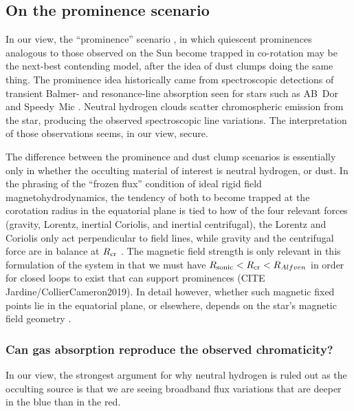 \documentclass[11pt,twocolumn,tighten]{aastex63}
\begin{document}
\subsection{On the prominence scenario}

In our view, the ``prominence'' scenario
\citep{2017AJ....153..152S,2022MNRAS.514.5465W}, in which quiescent
prominences analogous to those observed on the Sun become trapped in
co-rotation may be the next-best contending model, after the idea of
dust clumps doing the same thing.  The prominence idea historically
came from spectroscopic detections of transient Balmer- and
resonance-line absorption seen for stars such as AB~Dor and
Speedy~Mic \citep[see
e.g.][]{1989MNRAS.238..657C,1993MNRAS.262..369J,2019MNRAS.482.2853J}.
Neutral hydrogen clouds scatter chromospheric emission from the star,
producing the observed spectroscopic line variations.  The
interpretation of those observations seems, in our view, secure.

The difference between the prominence and dust clump scenarios
is essentially only in whether the occulting material of
interest is neutral hydrogen, or dust.  In the phrasing of the
``frozen flux'' condition of ideal rigid field magnetohydrodynamics,
the tendency of both to become trapped at the corotation radius in the
equatorial plane is tied to how of the four relevant forces (gravity,
Lorentz, inertial Coriolis, and inertial centrifugal), the Lorentz and
Coriolis only act perpendicular to field lines, while gravity and the
centrifugal force are in balance at $R_{\rm cr}$
\citep[see][Sec.~2]{2005MNRAS.357..251T}.
The magnetic field strength is only relevant in this formulation of
the system in that we must have $R_{\rm sonic} < R_{\rm cr} < R_{Alfven}$ in order for 
closed loops to exist that can support prominences (CITE
Jardine/CollierCameron2019).
In detail however, whether such magnetic fixed points lie in the equatorial
plane, or elsewhere, depends on the star's magnetic field geometry
\citep{2023MNRAS.518.4734S}.

\subsubsection{Can gas absorption reproduce the observed chromaticity?}
In our view, the strongest argument for why neutral hydrogen is ruled
out as the occulting source is that we are seeing broadband flux
variations that are deeper in the blue than in the red.
\end{document}
